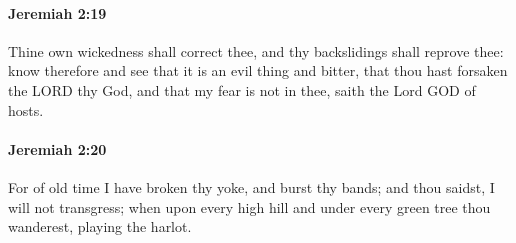		\paragraph{Jeremiah 2:19} %
			\label{JEREMIAH-2-19}

			Thine own wickedness shall correct thee, and thy backslidings shall reprove thee: know therefore and see that it is an evil thing and bitter, that thou hast forsaken the LORD thy God, and that my fear is not in thee, saith the Lord GOD of hosts.


		\paragraph{Jeremiah 2:20} %
			\label{JEREMIAH-2-20}

			For of old time I have broken thy yoke, and burst thy bands; and thou saidst, I will not transgress; when upon every high hill and under every green tree thou wanderest, playing the harlot.

